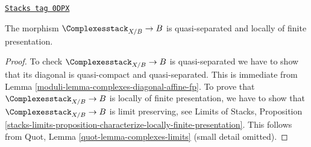 \begin{lemma}
\label{moduli-lemma-complexes-qs-lfp}
\href{https://stacks.math.columbia.edu/tag/0DPX}{\texttt{Stacks tag 0DPX}}

The morphism $\Complexesstack_{X/B} \to B$ is quasi-separated and
locally of finite presentation.
\end{lemma}

\begin{proof}

To check $\Complexesstack_{X/B} \to B$ is quasi-separated we have to
show that its diagonal is quasi-compact and quasi-separated.
This is immediate from Lemma \ref{moduli-lemma-complexes-diagonal-affine-fp}.
To prove that $\Complexesstack_{X/B} \to B$ is locally of finite
presentation, we have to show that $\Complexesstack_{X/B} \to B$
is limit preserving, see
Limits of Stacks, Proposition
\ref{stacks-limits-proposition-characterize-locally-finite-presentation}.
This follows from Quot, Lemma \ref{quot-lemma-complexes-limits}
(small detail omitted).
\end{proof}



